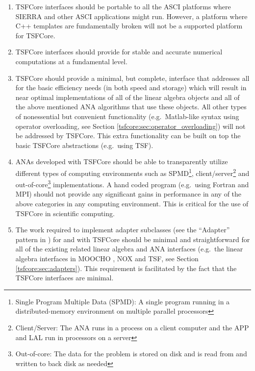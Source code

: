 \begin{enumerate}

\item
TSFCore interfaces should be portable to all the ASCI
\cite{ref:doe_asci} platforms where SIERRA
\cite{ref:SIERRA} and other ASCI applications might run.  However, a
platform where C++ templates are fundamentally broken will not be a
supported platform for TSFCore.

\item
TSFCore interfaces should provide for stable and accurate numerical
computations at a fundamental level.

\item
TSFCore should provide a minimal, but complete, interface that
addresses all for the basic efficiency needs (in both speed and
storage) which will result in near optimal implementations of all of
the linear algebra objects and all of the above mentioned ANA
algorithms that use these objects.  All other types of nonessential
but convenient functionality (e.g.~Matlab-like syntax using operator
overloading, see Section \ref{tsfcore:sec:operator_overloading}) will
not be addressed by TSFCore.  This extra functionality can be built on
top the basic TSFCore abstractions (e.g.~using TSF).

\item
ANAs developed with TSFCore should be able to transparently utilize
different types of computing environments such as SPMD\footnote{Single
Program Multiple Data (SPMD): A single program running in a
distributed-memory environment on multiple parallel processors},
client/server\footnote{Client/Server: The ANA runs in a process on a
client computer and the APP and LAL run in processors on a server} and
out-of-core\footnote{Out-of-core: The data for the problem is stored
on disk and is read from and written to back disk as needed}
implementations.  A hand coded program (e.g.~using Fortran and MPI)
should not provide any significant gains in performance in any of the
above categories in any computing environment.  This is critical for
the use of TSFCore in scientific computing.

\item
The work required to implement adapter subclasses (see the ``Adapter''
pattern in \cite{ref:gama_et_al_1995}) for and with TSFCore should be
minimal and straightforward for all of the existing related linear
algebra and ANA interfaces (e.g.~the linear algebra interfaces in
MOOCHO \cite{ref:moochouserguide}, NOX \cite{ref:nox} and TSF, see
Section \ref{tsfcore:sec:adapters}).  This requirement is facilitated
by the fact that the TSFCore interfaces are minimal.

\end{enumerate}


